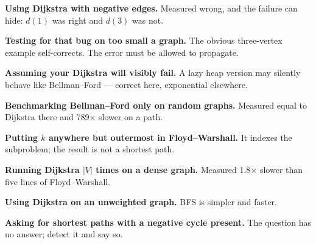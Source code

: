 \begin{pitfall}
\begin{tight}
  \item \textbf{Using Dijkstra with negative edges.} Measured wrong, and the
        failure can hide: $d(1)$ was right and $d(3)$ was not.
  \item \textbf{Testing for that bug on too small a graph.} The obvious
        three-vertex example self-corrects. The error must be allowed to
        propagate.
  \item \textbf{Assuming your Dijkstra will visibly fail.} A lazy heap version
        may silently behave like Bellman--Ford --- correct here, exponential
        elsewhere.
  \item \textbf{Benchmarking Bellman--Ford only on random graphs.} Measured
        equal to Dijkstra there and 789$\times$ slower on a path.
  \item \textbf{Putting $k$ anywhere but outermost in Floyd--Warshall.} It
        indexes the subproblem; the result is not a shortest path.
  \item \textbf{Running Dijkstra $|V|$ times on a dense graph.} Measured
        1.8$\times$ slower than five lines of Floyd--Warshall.
  \item \textbf{Using Dijkstra on an unweighted graph.} BFS is simpler and
        faster.
  \item \textbf{Asking for shortest paths with a negative cycle present.} The
        question has no answer; detect it and say so.
\end{tight}
\end{pitfall}

